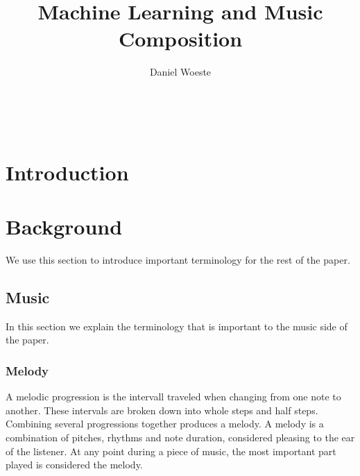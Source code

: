 \documentclass{sig-alternate}
\begin{document}

\title{Machine Learning and Music Composition}
\author{
\alignauthor
Daniel Woeste\\
	\\
	\\
	\\
}


\maketitle
\begin{abstract}

\end{abstract}


\section{Introduction}
\label{sec:introduction}

\section{Background}
\label{sec:background}
	We use this section to introduce important terminology for the rest of the paper.

\subsection{Music}
\label{sec:music}
	In this section we explain the terminology that is important to the music side of the paper.
\subsubsection{Melody}
\label{sec:melody}
A melodic progression is the intervall traveled when changing from one note to another. These intervals are broken down into whole steps and half steps. Combining several  progressions together produces a melody. A melody is a combination of pitches, rhythms and note duration, considered pleasing to the ear of the listener. At any point during a piece of music, the most important part played is considered the melody. 
\end{document}

